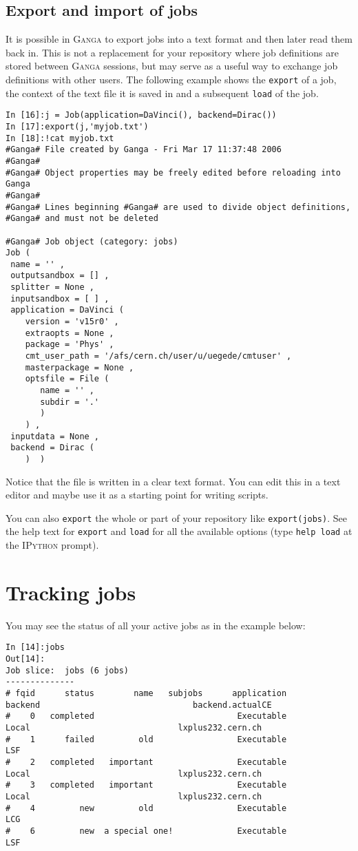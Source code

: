 \documentclass{howto}
\def\ganga {\textsc{Ganga}\xspace}
\def\ipython {\textsc{IPython}\xspace}
\begin{document}
\subsection{Export and import of jobs}
\label{sec:ExportImport}
It is possible in \ganga to export jobs into a text format and then later read
them back in. This is not a replacement for your repository where job
definitions are stored between \ganga sessions, but may serve as a useful way
to exchange job definitions with other users. The following example shows the
\texttt{export} of a job, the context of the text file it is saved in and a
subsequent \texttt{load} of the job.
\begin{verbatim}
In [16]:j = Job(application=DaVinci(), backend=Dirac())
In [17]:export(j,'myjob.txt')
In [18]:!cat myjob.txt
#Ganga# File created by Ganga - Fri Mar 17 11:37:48 2006
#Ganga#
#Ganga# Object properties may be freely edited before reloading into Ganga
#Ganga#
#Ganga# Lines beginning #Ganga# are used to divide object definitions,
#Ganga# and must not be deleted

#Ganga# Job object (category: jobs)
Job (
 name = '' ,
 outputsandbox = [] ,
 splitter = None ,
 inputsandbox = [ ] ,
 application = DaVinci (
    version = 'v15r0' ,
    extraopts = None ,
    package = 'Phys' ,
    cmt_user_path = '/afs/cern.ch/user/u/uegede/cmtuser' ,
    masterpackage = None ,
    optsfile = File (
       name = '' ,
       subdir = '.' 
       ) 
    ) ,
 inputdata = None ,
 backend = Dirac (
    )  ) 
\end{verbatim}
Notice that the file is written in a clear text format. You can edit this in a
text editor and maybe use it as a starting point for writing scripts. 

You can also \texttt{export} the whole or part of your repository like
\texttt{export(jobs)}. See the help text for \texttt{export} and \texttt{load}
for all the available options (type \texttt{help load} at the \ipython
prompt).



\section{Tracking jobs}
\label{sec:tracking}

You may see the status of all your active jobs as in the example below:
\begin{verbatim}
In [14]:jobs
Out[14]:
Job slice:  jobs (6 jobs)
--------------
# fqid      status        name   subjobs      application          backend                               backend.actualCE
#    0   completed                             Executable            Local                              lxplus232.cern.ch
#    1      failed         old                 Executable              LSF
#    2   completed   important                 Executable            Local                              lxplus232.cern.ch
#    3   completed   important                 Executable            Local                              lxplus232.cern.ch
#    4         new         old                 Executable              LCG
#    6         new  a special one!             Executable              LSF
\end{verbatim}
\end{document}
